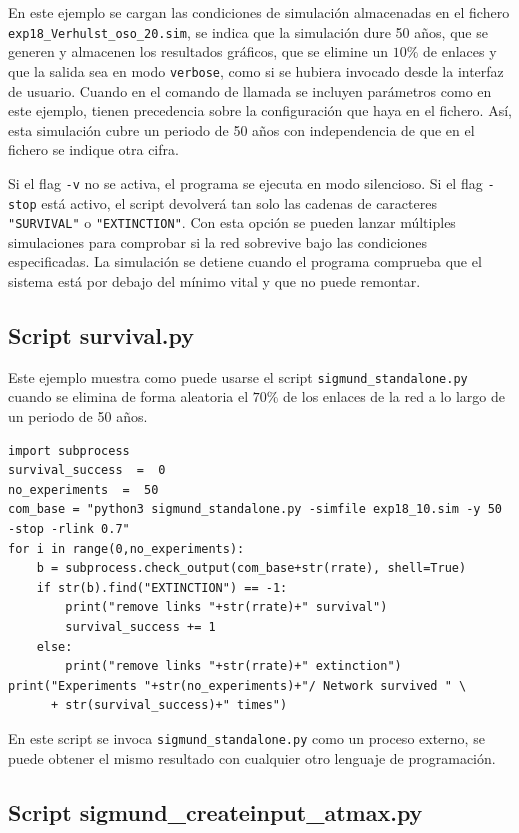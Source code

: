 En este ejemplo se cargan las condiciones de simulación almacenadas en el fichero \texttt{exp18\_Verhulst\_oso\_20.sim}, se indica que la simulación dure 50 años, que se generen y almacenen los resultados gráficos, que se elimine un $10\%$ de enlaces y que la salida sea en modo \texttt{verbose}, como si se hubiera invocado desde la interfaz de usuario. Cuando en el comando de llamada se incluyen parámetros como en este ejemplo, tienen precedencia sobre la configuración que haya en el fichero. Así, esta simulación cubre un periodo de 50 años con independencia de que en el fichero se indique otra cifra.  

Si el flag \texttt{-v} no se activa, el programa se ejecuta en modo silencioso. Si el flag \texttt{-stop} está activo, el script devolverá tan solo las cadenas de caracteres \texttt{"SURVIVAL"} o \texttt{"EXTINCTION"}. Con esta opción se pueden lanzar múltiples simulaciones para comprobar si la red sobrevive bajo las condiciones especificadas. La simulación se detiene cuando el programa comprueba que el sistema está por debajo del mínimo vital y que no puede remontar.


\subsection{Script survival.py}

\noindent Este ejemplo muestra como puede usarse el script \texttt{sigmund\_standalone.py} cuando se elimina de forma aleatoria el $70\%$ de los enlaces de la red a lo largo de un periodo de 50 años.

\fontsize{3mm}{3mm}\selectfont
\begin{verbatim}
import subprocess
survival_success  =  0
no_experiments  =  50
com_base = "python3 sigmund_standalone.py -simfile exp18_10.sim -y 50 -stop -rlink 0.7"
for i in range(0,no_experiments):
    b = subprocess.check_output(com_base+str(rrate), shell=True)
    if str(b).find("EXTINCTION") == -1:
        print("remove links "+str(rrate)+" survival")
        survival_success += 1
    else:
        print("remove links "+str(rrate)+" extinction")
print("Experiments "+str(no_experiments)+"/ Network survived " \
      + str(survival_success)+" times")
\end{verbatim}
\normalsize

En este script se invoca \texttt{sigmund\_standalone.py} como un proceso externo, se puede obtener el mismo resultado con cualquier
otro lenguaje de programación.

\subsection{Script sigmund\_createinput\_atmax.py}

